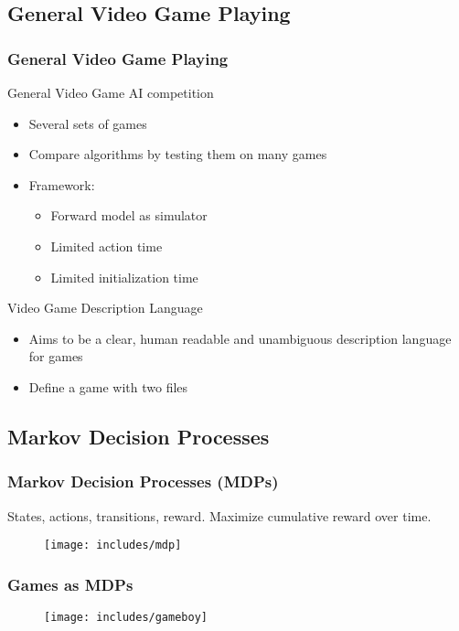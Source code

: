 \documentclass{beamer}
\begin{document}
\subsection{General Video Game Playing}
\begin{frame}
	\frametitle{General Video Game Playing \cite{perez2014, schaul2013video}}
	\begin{block}{General Video Game AI competition}
		\begin{itemize}
			\item Several sets of games
			\item Compare algorithms by testing them on many games
			\item Framework:
				\begin{itemize}
					\item Forward model as simulator
					\item Limited action time
					\item Limited initialization time
				\end{itemize}
		\end{itemize}
	\end{block}
	\begin{block}{Video Game Description Language}
		\begin{itemize}
			\item Aims to be a clear, human readable and unambiguous
				description language for games
			\item Define a game with two files
		\end{itemize}
	\end{block}
\end{frame}

\subsection{Markov Decision Processes}
\begin{frame}
	\frametitle{Markov Decision Processes (MDPs) \cite{sutton1998reinforcement}}
	States, actions, transitions, reward. Maximize cumulative reward over time.
	\begin{figure}
	\centering
	\texttt{[image: includes/mdp]}
	\end{figure}
\end{frame}
\begin{frame}
	\frametitle{Games as MDPs}
	\begin{figure}
	\centering
	\texttt{[image: includes/gameboy]}
	\end{figure}
\end{frame}
\end{document}
